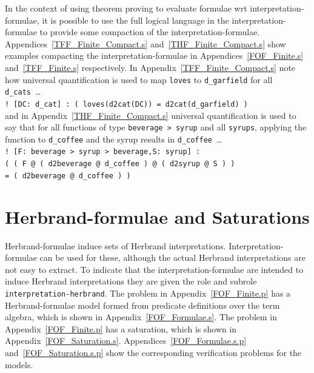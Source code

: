 \documentclass{easychair}
\newcommand{\smalltt}[1]{\small \texttt{#1}}
\begin{document}
In the context of using theorem proving to evaluate formulae wrt interpretation-formulae, it is 
possible to use the full logical language in the interpretation-formulae to provide some 
compaction of the interpretation-formulae.
Appendices~\ref{TFF_Finite_Compact.s} and~\ref{THF_Finite_Compact.s} show examples compacting the
interpretation-formulae in Appendices~\ref{FOF_Finite.s} and~\ref{TFF_Finite.s} respectively.
In Appendix~\ref{TFF_Finite_Compact.s} note how universal quantification is used to map
{\tt loves} to {\tt d\_garfield} for all {\tt d\_cats}~\ldots \\
\hspace*{0.5cm}\smalltt{! [DC: d\_cat] : ( loves(d2cat(DC)) = d2cat(d\_garfield) )} \\
and in Appendix~\ref{THF_Finite_Compact.s} universal quantification is used to say that for all
functions of type {\tt beverage > syrup} and all {\tt syrups}, applying the function to
{\tt d\_coffee} and the syrup results in {\tt d\_coffee}~\ldots \\
\hspace*{0.5cm}\smalltt{! [F: beverage > syrup > beverage,S: syrup] :} \\
\hspace*{0.8cm}\smalltt{( ( F @ ( d2beverage @ d\_coffee ) @ ( d2syrup @ S ) )} \\
\hspace*{0.8cm}\smalltt{= ( d2beverage @ d\_coffee ) )}

\section{Herbrand-formulae and Saturations}
\label{NewHerbrand}

Herbrand-formulae induce sets of Herbrand interpretations.
Interpretation-formulae can be used for these, although the actual Herbrand interpretations are
not easy to extract.
To indicate that the interpretation-formulae are intended to induce Herbrand interpretations they
are given the role and subrole {\tt interpretation-herbrand}.
The problem in Appendix~\ref{FOF_Finite.p} has a Herbrand-formulae model formed from predicate 
definitions over the term algebra, which is shown in Appendix~\ref{FOF_Formulae.s}.
The problem in Appendix~\ref{FOF_Finite.p} has a saturation, which is shown in
Appendix~\ref{FOF_Saturation.s}.
Appendices~\ref{FOF_Formulae.s.p} and~\ref{FOF_Saturation.s.p} show the corresponding verification 
problems for the models.
\end{document}
